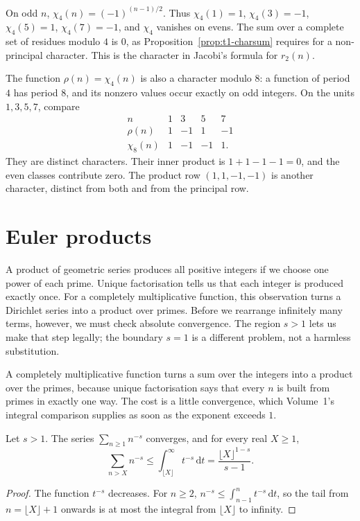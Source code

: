 \begin{examplex}
On odd $n$, $\chi_4(n)=(-1)^{(n-1)/2}$. Thus $\chi_4(1)=1$, $\chi_4(3)=-1$, $\chi_4(5)=1$, $\chi_4(7)=-1$, and $\chi_4$ vanishes on evens. The sum over a complete set of residues modulo $4$ is $0$, as Proposition~\ref{prop:t1-charsum} requires for a non-principal character. This is the character in Jacobi's formula for $r_2(n)$.
\end{examplex}

\begin{examplex}
The function $\rho(n)=\chi_4(n)$ is also a character modulo $8$: a function of period $4$ has period $8$, and its nonzero values occur exactly on odd integers. On the units $1,3,5,7$, compare
\[
\begin{array}{c|rrrr}
n&1&3&5&7\\\hline
\rho(n)&1&-1&1&-1\\
\chi_8(n)&1&-1&-1&1.
\end{array}
\]
They are distinct characters. Their inner product is
$1+1-1-1=0$, and the even classes contribute zero. The product row $(1,1,-1,-1)$ is another character, distinct from both and from the principal row.
\end{examplex}

\section{Euler products}

A product of geometric series produces all positive integers if we choose one power of each prime. Unique factorisation tells us that each integer is produced exactly once. For a completely multiplicative function, this observation turns a Dirichlet series into a product over primes. Before we rearrange infinitely many terms, however, we must check absolute convergence. The region $s>1$ lets us make that step legally; the boundary $s=1$ is a different problem, not a harmless substitution.

A completely multiplicative function turns a sum over the integers into a product over the primes, because unique factorisation says that every $n$ is built from primes in exactly one way. The cost is a little convergence, which Volume~1's integral comparison supplies as soon as the exponent exceeds $1$.

\begin{lemma}\label{lem:t1-pseries}
Let $s>1$. The series $\sum_{n\ge1}n^{-s}$ converges, and for every real $X\ge1$,
\[
\sum_{n>X}n^{-s}\le\int_{\lfloor X\rfloor}^{\infty}t^{-s}\,\mathrm dt=\frac{\lfloor X\rfloor^{1-s}}{s-1}.
\]
\end{lemma}
\begin{proof}
The function $t^{-s}$ decreases. For $n\ge2$, $n^{-s}\le\int_{n-1}^n t^{-s}\,\mathrm dt$, so the tail from $n=\lfloor X\rfloor+1$ onwards is at most the integral from $\lfloor X\rfloor$ to infinity.
\end{proof}

